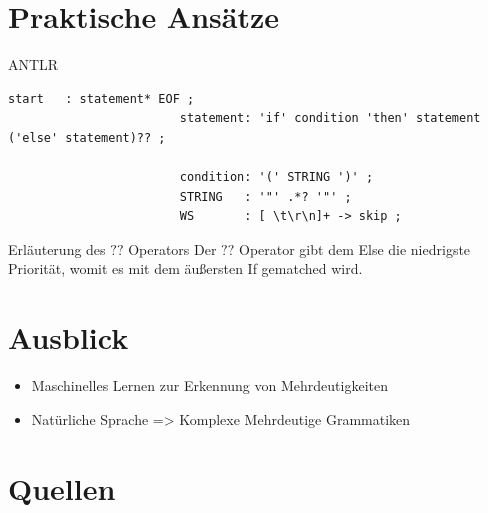 \documentclass[t]{beamer}
\begin{document}
	\section{Praktische Ansätze}\label{sec:praktische-ansatze}
	\begin{frame}[fragile]
			\begin{block}{ANTLR}
				\begin{minipage}{\textwidth}
					\begin{lstlisting}[style=antlr,label={lst:lstlisting3}]
						start   : statement* EOF ;
						statement: 'if' condition 'then' statement ('else' statement)?? ;

						condition: '(' STRING ')' ;
						STRING   : '"' .*? '"' ;
						WS       : [ \t\r\n]+ -> skip ;
					\end{lstlisting}
				\end{minipage}
			\end{block}
			\vspace{1em}
			\begin{exampleblock}{Erläuterung des \(??\) Operators}
				Der \(??\) Operator gibt dem Else die niedrigste Priorität, womit es mit dem äußersten If gematched wird. \\
			\end{exampleblock}\cite{parr}
	\end{frame}


	\section{Ausblick}\label{sec:ausblick-und-zukunftige-projekte}
	\begin{frame}
		\begin{itemize}
			\item Maschinelles Lernen zur Erkennung von Mehrdeutigkeiten
			\item Natürliche Sprache => Komplexe Mehrdeutige Grammatiken
		\end{itemize}
	\end{frame}


	\section{Quellen}\label{sec:quellen}
	\begin{frame}[allowframebreaks]
		
		
	\end{frame}
\end{document}
